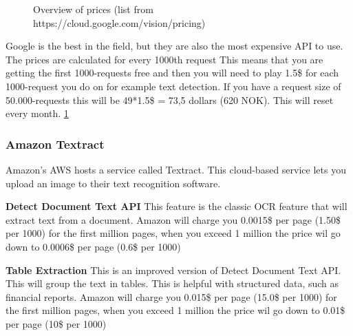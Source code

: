 \begin{figure}[h]
    \caption{Overview of prices (list from https://cloud.google.com/vision/pricing)}
    \label{fig:Amazon textract prices}

\end{figure}

Google is the best in the field, but they are also the most expensive API to use.
The prices are calculated for every 1000th request
This means that you are getting the first 1000-requests free and then you will need to play 1.5\$ for each 1000-request you do on for example text detection.
If you have a request size of 50.000-requests this will be 49*1.5\$ = 73,5 dollars (620 NOK). 
This will reset every month. \ref{fig:Amazon textract prices}

\subsubsection{Amazon Textract}\label{subsubsec:API_Amazon}

Amazon's AWS hosts a service called Textract.
This cloud-based service lets you upload an image to their text recognition software.

\textbf{Detect Document Text API}
This feature is the classic OCR feature that will extract text from a document.
Amazon will charge you 0.0015\$ per page (1.50\$ per 1000) for the first million pages, when you exceed 1 million the price wil go down to
0.0006\$ per page (0.6\$ per 1000)

\textbf{Table Extraction}
This is an improved version of Detect Document Text API. This will group the text in tables.
This is helpful with structured data, such as financial reports.
Amazon will charge you 0.015\$ per page (15.0\$ per 1000) for the first million pages, when you exceed 1 million the price wil go down to
0.01\$ per page (10\$ per 1000)


